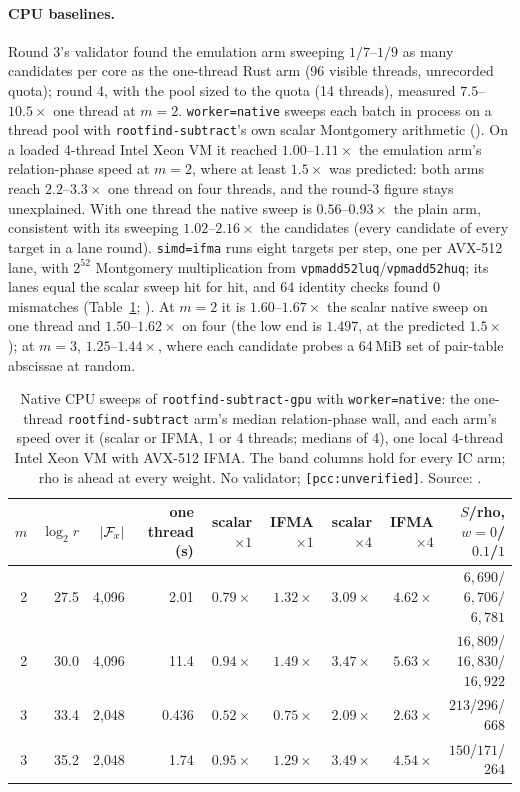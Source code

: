 \paragraph{CPU baselines.} Round 3's validator found the emulation arm
sweeping $1/7$--$1/9$ as many candidates per core as the one-thread Rust
arm (96 visible threads, unrecorded quota); round 4, with the pool sized
to the quota (14 threads), measured $7.5$--$10.5\times$ one thread at $m=2$.
\texttt{worker=native} sweeps each batch in process on a thread pool with
\texttt{rootfind-subtract}'s own scalar Montgomery arithmetic
(). On a loaded 4-thread
Intel Xeon VM it reached $1.00$--$1.11\times$ the emulation arm's
relation-phase speed at $m=2$, where at least $1.5\times$ was predicted:
both arms reach $2.2$--$3.3\times$ one thread on four threads, and the
round-3 figure stays unexplained. With one thread the native sweep is
$0.56$--$0.93\times$ the plain arm, consistent with its sweeping
$1.02$--$2.16\times$ the candidates (every candidate of every target in a
lane round). \texttt{simd=ifma} runs eight targets per step, one per
AVX-512 lane, with $2^{52}$ Montgomery multiplication from
\texttt{vpmadd52luq}/\texttt{vpmadd52huq}; its lanes equal the scalar sweep
hit for hit, and 64 identity checks found 0 mismatches
(Table~\ref{tab:rf-ifma}; ).
At $m=2$ it is $1.60$--$1.67\times$ the scalar native sweep on one thread
and $1.50$--$1.62\times$ on four (the low end is $1.497$, at the predicted
$1.5\times$); at $m=3$, $1.25$--$1.44\times$, where each candidate probes a
64\,MiB set of pair-table abscissae at random.

\begin{table}[t]
\centering\small
\begin{tabular}{@{}rrrrrrrrr@{}}
\toprule
$m$ & $\log_2r$ & $\lvert \mathcal{F}_x \rvert$ & one thread (s) & scalar $\times1$ & IFMA $\times1$ & scalar $\times4$ & IFMA $\times4$ & $S$/rho, $w=0$/$0.1$/$1$ \\
\midrule
2 & 27.5 & 4{,}096 & 2.01 & $0.79\times$ & $1.32\times$ & $3.09\times$ & $4.62\times$ & $6{,}690$/$6{,}706$/$6{,}781$ \\
2 & 30.0 & 4{,}096 & 11.4 & $0.94\times$ & $1.49\times$ & $3.47\times$ & $5.63\times$ & $16{,}809$/$16{,}830$/$16{,}922$ \\
3 & 33.4 & 2{,}048 & 0.436 & $0.52\times$ & $0.75\times$ & $2.09\times$ & $2.63\times$ & $213$/$296$/$668$ \\
3 & 35.2 & 2{,}048 & 1.74 & $0.95\times$ & $1.29\times$ & $3.49\times$ & $4.54\times$ & $150$/$171$/$264$ \\
\bottomrule
\end{tabular}
\caption[]{Native CPU sweeps of \texttt{rootfind-subtract-gpu} with
\texttt{worker=native}: the one-thread \texttt{rootfind-subtract} arm's
median relation-phase wall, and each arm's speed over it (scalar or IFMA,
1 or 4 threads; medians of 4), one local 4-thread Intel Xeon VM with
AVX-512 IFMA. The band columns hold for every IC arm; rho is ahead at every
weight. No validator; \texttt{[pcc:unverified]}. Source:
.}
\label{tab:rf-ifma}
\end{table}


